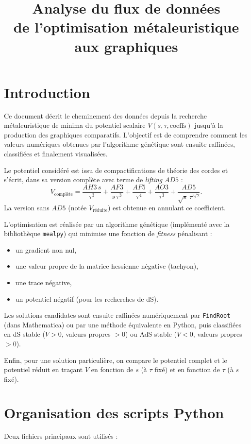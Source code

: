 \documentclass[a4paper,12pt]{article}
\title{\textbf{Analyse du flux de données} \\ de l'optimisation métaleuristique aux graphiques}
\author{}
\date{}
\begin{document}
\maketitle

\tableofcontents
\newpage

\section{Introduction}
Ce document décrit le cheminement des données depuis la recherche métaleuristique de minima du potentiel scalaire $V(s,\tau,\text{coeffs})$ jusqu'à la production des graphiques comparatifs. L'objectif est de comprendre comment les valeurs numériques obtenues par l'algorithme génétique sont ensuite raffinées, classifiées et finalement visualisées.

Le potentiel considéré est issu de compactifications de théorie des cordes et s'écrit, dans sa version complète avec terme de \textit{lifting} $AD5$ :
\[
V_{\text{complète}} = \frac{AH3\,s}{\tau^3} + \frac{AF3}{s\,\tau^3} + \frac{AF5}{\tau^4} + \frac{AO3}{\tau^3} + \frac{AD5}{\sqrt{s}\,\tau^{5/2}}.
\]
La version sans $AD5$ (notée $V_{\text{réduite}}$) est obtenue en annulant ce coefficient.

L'optimisation est réalisée par un algorithme génétique (implémenté avec la bibliothèque \texttt{mealpy}) qui minimise une fonction de \textit{fitness} pénalisant :
\begin{itemize}
    \item un gradient non nul,
    \item une valeur propre de la matrice hessienne négative (tachyon),
    \item une trace négative,
    \item un potentiel négatif (pour les recherches de dS).
\end{itemize}
Les solutions candidates sont ensuite raffinées numériquement par \texttt{FindRoot} (dans Mathematica) ou par une méthode équivalente en Python, puis classifiées en dS stable ($V>0$, valeurs propres $>0$) ou AdS stable ($V<0$, valeurs propres $>0$).

Enfin, pour une solution particulière, on compare le potentiel complet et le potentiel réduit en traçant $V$ en fonction de $s$ (à $\tau$ fixé) et en fonction de $\tau$ (à $s$ fixé).

\section{Organisation des scripts Python}
Deux fichiers principaux sont utilisés :
\end{document}
